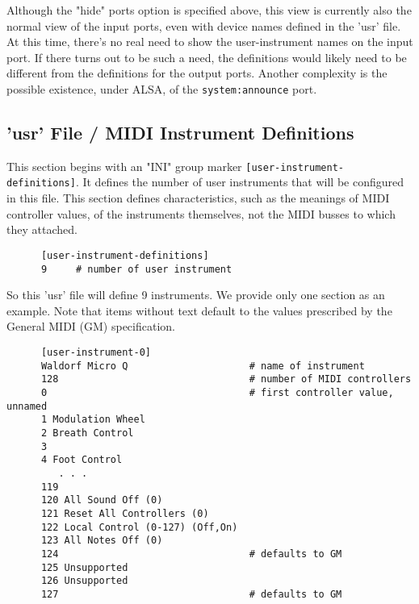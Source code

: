    Although the "hide" ports option is specified above, this view is
   currently also the normal view of the input ports, even with device names
   defined in the 'usr' file.
   At this time, there's no real need to show the user-instrument names
   on the input port.  If there turns out to be such a need, the definitions
   would likely need to be different from the definitions for the output ports.
   Another complexity is the possible existence, under ALSA, of the
   \texttt{system:announce} port.

\fi

\subsection{'usr' File / MIDI Instrument Definitions}
\label{subsec:usr_file_midi_instrument_definitions}

   This section begins with an
   "INI" group marker \texttt{[user-instrument-definitions]}.
   It defines the number of user instruments that will be configured in this
   file.  This section defines characteristics, such as
   the meanings of MIDI controller values, of the instruments themselves,
   not the MIDI busses to which they attached.

   \begin{verbatim}
      [user-instrument-definitions]
      9     # number of user instrument
   \end{verbatim}

   So this 'usr' file will define 9 instruments.  We provide only one section
   as an example.  Note that items without text default to the values
   prescribed by the General MIDI (GM) specification.

   \begin{verbatim}
      [user-instrument-0]
      Waldorf Micro Q                     # name of instrument
      128                                 # number of MIDI controllers
      0                                   # first controller value, unnamed
      1 Modulation Wheel
      2 Breath Control
      3 
      4 Foot Control
         . . .
      119
      120 All Sound Off (0)
      121 Reset All Controllers (0)
      122 Local Control (0-127) (Off,On)
      123 All Notes Off (0)
      124                                 # defaults to GM
      125 Unsupported
      126 Unsupported
      127                                 # defaults to GM
   \end{verbatim}

